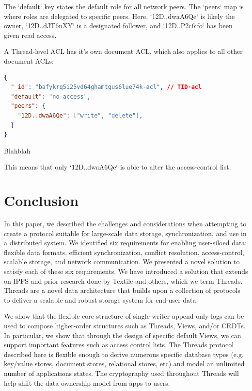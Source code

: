 \documentclass{comjnl}
\begin{document}
The `default` key states the default role for all network peers. The `peers` map is where roles are delegated to specific peers. Here, `12D..dwaA6Qe` is likely the owner, `12D..dJT6nXY` is a designated follower, and `12D..P2c6ifo` has been given read access.

 A Thread-level ACL has it’s own document ACL, which also applies to all other document ACLs:

\begin{example}
\begin{lstlisting}[language=json,firstnumber=1]
{
  "_id": "bafykrq5i25vd64ghamtgus6lue74k-acl", // TID-acl
  "default": "no-access",
  "peers": {
    "12D..dwaA6Qe": ["write", "delete"],
  }
}
\end{lstlisting}
\caption{Blahblah}
\end{example}

This means that only `12D..dwaA6Qe` is able to alter the access-control list.

\section{Conclusion}

In this paper, we described the challenges and considerations when attempting to create a protocol suitable for large-scale data storage, synchronization, and use in a distributed system. We identified six requirements for enabling user-siloed data: flexible data formats, efficient synchronization, conflict resolution, access-control, scalable storage, and network communication. We presented a novel solution to satisfy each of these six requirements. We have introduced a solution that extends on IPFS and prior research done by Textile and others, which we term Threads. Threads are a novel data architecture that builds upon a collection of protocols to deliver a scalable and robust storage system for end-user data. 

We show that the flexible core structure of single-writer append-only logs can be used to compose higher-order structures such as Threads, Views, and/or CRDTs. In particular, we show that through the design of specific default Views, we can support important features such as access control lists. The Threads protocol described here is flexible enough to derive numerous specific database types (e.g. key/value stores, document stores, relational stores, etc) and model an unlimited number of applications states. The cryptography used throughout Threads will help shift the data ownership model from apps to users. 
\end{document}
